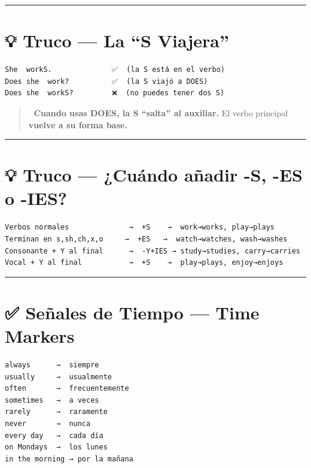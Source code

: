 \documentclass[
  spanish,
  letterpaper,
]{scrbook}
\begin{document}
\begin{center}\rule{0.5\linewidth}{0.5pt}\end{center}

\section{💡 Truco --- La ``S Viajera''}\label{truco-la-s-viajera}

\begin{verbatim}
She  workS.              ✅  (la S está en el verbo)
Does she  work?          ✅  (la S viajó a DOES)
Does she  workS?         ❌  (no puedes tener dos S)
\end{verbatim}

\begin{quote}
🧠 \textbf{Cuando usas DOES, la S ``salta'' al auxiliar.} El verbo
principal \textbf{vuelve a su forma base.}
\end{quote}

\begin{center}\rule{0.5\linewidth}{0.5pt}\end{center}

\section{💡 Truco --- ¿Cuándo añadir -S, -ES o
-IES?}\label{truco-cuuxe1ndo-auxf1adir--s--es-o--ies}

\begin{verbatim}
Verbos normales              →  +S    →  work→works, play→plays
Terminan en s,sh,ch,x,o     →  +ES   →  watch→watches, wash→washes
Consonante + Y al final      →  -Y+IES → study→studies, carry→carries
Vocal + Y al final           →  +S    →  play→plays, enjoy→enjoys
\end{verbatim}

\begin{center}\rule{0.5\linewidth}{0.5pt}\end{center}

\section{✅ Señales de Tiempo --- Time
Markers}\label{seuxf1ales-de-tiempo-time-markers}

\begin{verbatim}
always      →  siempre
usually     →  usualmente
often       →  frecuentemente
sometimes   →  a veces
rarely      →  raramente
never       →  nunca
every day   →  cada día
on Mondays  →  los lunes
in the morning → por la mañana
\end{verbatim}
\end{document}
